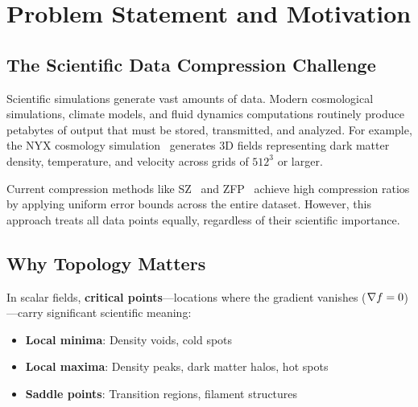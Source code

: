 \section{Problem Statement and Motivation}
\label{sec:problem}


\subsection{The Scientific Data Compression Challenge}

Scientific simulations generate vast amounts of data. Modern cosmological simulations, climate models, and fluid dynamics computations routinely produce petabytes of output that must be stored, transmitted, and analyzed. For example, the NYX cosmology simulation~\cite{nyx2013} generates 3D fields representing dark matter density, temperature, and velocity across grids of $512^3$ or larger.


Current compression methods like SZ~\cite{sz2016} and ZFP~\cite{zfp2014} achieve high compression ratios by applying uniform error bounds across the entire dataset. However, this approach treats all data points equally, regardless of their scientific importance.

\subsection{Why Topology Matters}

In scalar fields, \textbf{critical points}---locations where the gradient vanishes ($\nabla f = 0$)---carry significant scientific meaning:
\begin{itemize}
    \item \textbf{Local minima}: Density voids, cold spots
    \item \textbf{Local maxima}: Density peaks, dark matter halos, hot spots
    \item \textbf{Saddle points}: Transition regions, filament structures
\end{itemize}

